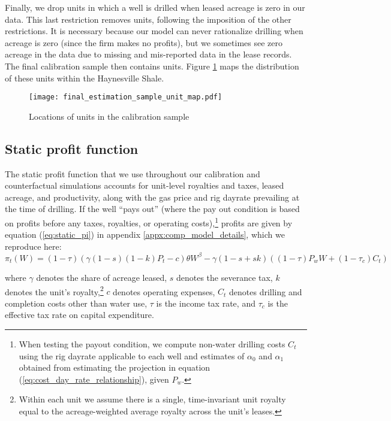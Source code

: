 \documentclass[12pt]{article}
\newcommand{\figcapt}[2][\linewidth]{
    \setcaptionwidth{#1}
    \centering
    \caption{#2}}
\begin{document}
Finally, we drop units in which a well is drilled when leased acreage is zero in our data. This last restriction removes units, following the imposition of the other restrictions. It is necessary because our model can never rationalize drilling when acreage is zero (since the firm makes no profits), but we sometimes see zero acreage in the data due to missing and mis-reported data in the lease records. The final calibration sample then contains units. Figure \ref{fig:calibration_unit_map} maps the distribution of these units within the Haynesville Shale.

\begin{figure}[!t]
\centering
\figcapt[\textwidth]{Locations of units in the calibration sample}
\texttt{[image: final\_estimation\_sample\_unit\_map.pdf]}
\label{fig:calibration_unit_map}
\end{figure}



\subsection{Static profit function}

The static profit function that we use throughout our calibration and counterfactual simulations accounts for unit-level royalties and taxes, leased acreage, and productivity, along with the gas price and rig dayrate prevailing at the time of drilling. If the well ``pays out'' (where the pay out condition is based on profits before any taxes, royalties, or operating costs),\footnote{When testing the payout condition, we compute non-water drilling costs $C_t$ using the rig dayrate applicable to each well and estimates of $\alpha_0$ and $\alpha_1$ obtained from estimating the projection in equation (\ref{eq:cost_day_rate_relationship}), given $P_w$.} profits are given by equation (\ref{eq:static_pi}) in appendix \ref{appx:comp_model_details}, which we reproduce here:
\begin{equation}
\pi_t(W) = (1-\tau)(\gamma(1-s)(1-k)P_t-c)\theta W^{\beta} - \gamma(1-s+sk)((1-\tau) P_w W + (1-\tau_c) C_t) 
\end{equation}

\noindent where $\gamma$ denotes the share of acreage leased, $s$ denotes the severance tax, $k$ denotes the unit's royalty,\footnote{Within each unit we assume there is a single, time-invariant unit royalty equal to the acreage-weighted average royalty across the unit's leases.} $c$ denotes operating expenses, $C_t$ denotes drilling and completion costs other than water use, $\tau$ is the income tax rate, and $\tau_c$ is the effective tax rate on capital expenditure.
\end{document}
